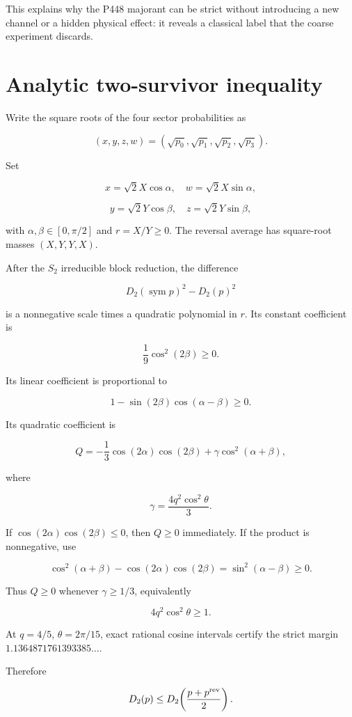 \documentclass[11pt,a4paper,openany]{report}
\begin{document}
This explains why the P448 majorant can be strict without introducing a new channel or a hidden physical effect: it reveals a classical label that the coarse experiment discards.

\section{Analytic two-survivor inequality}

Write the square roots of the four sector probabilities as

\[
(x,y,z,w)=
(\sqrt{p_0},\sqrt{p_1},\sqrt{p_2},\sqrt{p_3}).
\]

Set

\[
x=\sqrt2X\cos\alpha,\quad
w=\sqrt2X\sin\alpha,
\]

\[
y=\sqrt2Y\cos\beta,\quad
z=\sqrt2Y\sin\beta,
\]

with \(\alpha,\beta\in[0,\pi/2]\) and \(r=X/Y\ge0\). The reversal average has square-root masses \((X,Y,Y,X)\).

After the \(S_2\) irreducible block reduction, the difference

\[
D_2(\operatorname{sym}p)^2-D_2(p)^2
\]

is a nonnegative scale times a quadratic polynomial in \(r\). Its constant coefficient is

\[
\frac19\cos^2(2\beta)\ge0.
\]

Its linear coefficient is proportional to

\[
1-\sin(2\beta)\cos(\alpha-\beta)\ge0.
\]

Its quadratic coefficient is

\[
Q=-\frac13\cos(2\alpha)\cos(2\beta)
+\gamma\cos^2(\alpha+\beta),
\]

where

\[
\gamma=\frac{4q^2\cos^2\theta}{3}.
\]

If \(\cos(2\alpha)\cos(2\beta)\le0\), then \(Q\ge0\) immediately. If the product is nonnegative, use

\[
\cos^2(\alpha+\beta)
-\cos(2\alpha)\cos(2\beta)
=\sin^2(\alpha-\beta)\ge0.
\]

Thus \(Q\ge0\) whenever \(\gamma\ge1/3\), equivalently

\[
4q^2\cos^2\theta\ge1.
\]

At \(q=4/5\), \(\theta=2\pi/15\), exact rational cosine intervals certify the strict margin \(1.1364871761393385\ldots\).

Therefore

\[
D_2(p)\le D_2\!\left(\frac{p+p^{\rm rev}}2\right).
\]
\end{document}
